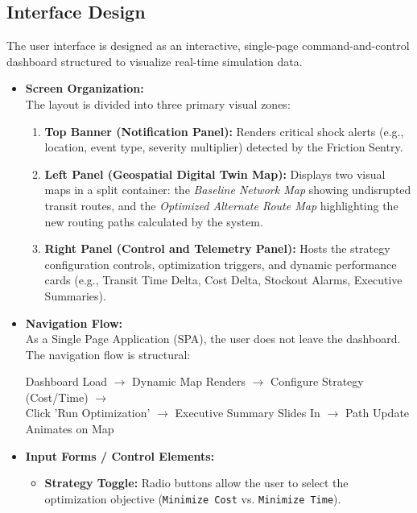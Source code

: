 \subsection[Interface Design]{Interface Design}

The user interface is designed as an interactive, single-page command-and-control dashboard structured to visualize real-time simulation data.

\begin{itemize}
    \item \textbf{Screen Organization:} \\
    The layout is divided into three primary visual zones:
    \begin{enumerate}[label=\alph*)]
        \item \textbf{Top Banner (Notification Panel):} Renders critical shock alerts (e.g., location, event type, severity multiplier) detected by the Friction Sentry.
        \item \textbf{Left Panel (Geospatial Digital Twin Map):} Displays two visual maps in a split container: the \textit{Baseline Network Map} showing undisrupted transit routes, and the \textit{Optimized Alternate Route Map} highlighting the new routing paths calculated by the system.
        \item \textbf{Right Panel (Control and Telemetry Panel):} Hosts the strategy configuration controls, optimization triggers, and dynamic performance cards (e.g., Transit Time Delta, Cost Delta, Stockout Alarms, Executive Summaries).
    \end{enumerate}
    \item \textbf{Navigation Flow:} \\
    As a Single Page Application (SPA), the user does not leave the dashboard. The navigation flow is structural:
    \begin{center}
        \small
        Dashboard Load $\rightarrow$ Dynamic Map Renders $\rightarrow$ Configure Strategy (Cost/Time) $\rightarrow$ \\
        Click 'Run Optimization' $\rightarrow$ Executive Summary Slides In $\rightarrow$ Path Update Animates on Map
    \end{center}
    \item \textbf{Input Forms / Control Elements:}
    \begin{itemize}
        \item \textbf{Strategy Toggle:} Radio buttons allow the user to select the optimization objective (\texttt{Minimize Cost} vs. \texttt{Minimize Time}).

\end{itemize}
\end{itemize}
